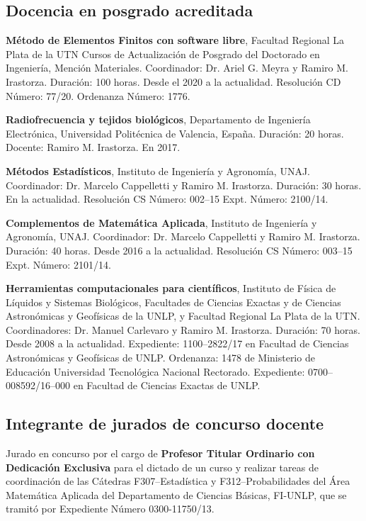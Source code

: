 \documentclass[margin,line]{res}
\begin{document}
\begin{resume}
\subsection{ Docencia en posgrado acreditada}

{\bf Método de Elementos Finitos con software libre}, Facultad Regional La Plata de la UTN Cursos de Actualización de Posgrado del Doctorado en Ingeniería, Mención Materiales. Coordinador: Dr. Ariel G. Meyra y Ramiro M. Irastorza. Duración: 100 horas. Desde el 2020 a la actualidad. Resolución CD Número: 77/20. Ordenanza Número: 1776.

{\bf Radiofrecuencia y tejidos biológicos}, Departamento de Ingeniería Electrónica, Universidad Politécnica de Valencia, España. Duración: 20 horas. Docente: Ramiro M. Irastorza. En 2017.

{\bf Métodos Estadísticos}, Instituto de Ingeniería y Agronomía, UNAJ. Coordinador: Dr. Marcelo Cappelletti y Ramiro M. Irastorza. Duración: 30 horas.  En la actualidad. Resolución CS Número: 002--15 Expt. Número: 2100/14.

{\bf Complementos de Matemática Aplicada}, Instituto de Ingeniería y Agronomía, UNAJ. Coordinador: Dr. Marcelo Cappelletti y Ramiro M. Irastorza. Duración: 40 horas.  Desde 2016 a la actualidad. Resolución CS Número: 003--15 Expt. Número: 2101/14.

{\bf Herramientas computacionales para científicos}, Instituto de Física de Líquidos y Sistemas Biológicos, Facultades de Ciencias Exactas y de Ciencias Astronómicas y Geofísicas de la UNLP, y Facultad Regional La Plata de la UTN. Coordinadores: Dr. Manuel Carlevaro y Ramiro M. Irastorza. Duración: 70 horas. Desde 2008 a la actualidad. Expediente: 1100--2822/17 en Facultad de Ciencias Astronómicas y Geofísicas de UNLP. Ordenanza: 1478 de Ministerio de Educación Universidad Tecnológica Nacional Rectorado. Expediente: 0700--008592/16--000 en Facultad de Ciencias Exactas de UNLP.


\subsection{ Integrante de jurados de concurso docente}

Jurado en concurso por el cargo de {\bf Profesor Titular Ordinario con Dedicación Exclusiva} para el dictado de un curso y realizar tareas de coordinación de las Cátedras  F307--Estadística y F312--Probabilidades del Área Matemática Aplicada del Departamento de Ciencias Básicas, FI-UNLP, que se tramitó por Expediente Número 0300-11750/13.


\end{resume}
\end{document}

